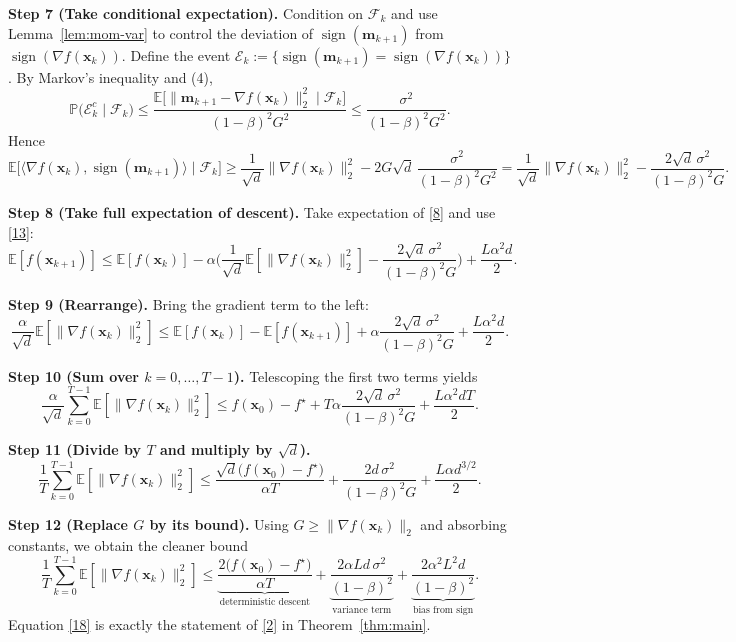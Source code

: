 \documentclass{article}
\newcommand{\sign}{\operatorname{sign}}
\newcommand{\E}{\mathbb{E}}
\begin{document}
\noindent\textbf{Step 7 (Take conditional expectation).}  
Condition on $\mathcal{F}_{k}$ and use Lemma~\ref{lem:mom-var} to control the deviation of $\sign(\bm{m}_{k+1})$ from $\sign(\nabla f(\bm{x}_{k}))$.  
Define the event $\mathcal{E}_{k}:=\{\sign(\bm{m}_{k+1})=\sign(\nabla f(\bm{x}_{k}))\}$. By Markov’s inequality and (4),
\[
\mathbb{P}\big(\mathcal{E}_{k}^{c}\mid\mathcal{F}_{k}\big)
\le \frac{\E\!\big[\|\bm{m}_{k+1}-\nabla f(\bm{x}_{k})\|_{2}^{2}\mid\mathcal{F}_{k}\big]}
{(1-\beta)^{2}G^{2}}
\le \frac{\sigma^{2}}{(1-\beta)^{2}G^{2}}. \tag{12}
\]
Hence
\[
\E\!\big[\langle\nabla f(\bm{x}_{k}),\sign(\bm{m}_{k+1})\rangle\mid\mathcal{F}_{k}\big]
\ge \frac{1}{\sqrt{d}}\|\nabla f(\bm{x}_{k})\|_{2}^{2}
-2G\sqrt{d}\,\frac{\sigma^{2}}{(1-\beta)^{2}G^{2}}
= \frac{1}{\sqrt{d}}\|\nabla f(\bm{x}_{k})\|_{2}^{2}
-\frac{2\sqrt{d}\,\sigma^{2}}{(1-\beta)^{2}G}. \tag{13}
\]

\noindent\textbf{Step 8 (Take full expectation of descent).}  
Take expectation of \eqref{8} and use \eqref{13}:
\[
\E[f(\bm{x}_{k+1})]\le \E[f(\bm{x}_{k})]
-\alpha\Big(\frac{1}{\sqrt{d}}\E[\|\nabla f(\bm{x}_{k})\|_{2}^{2}]
-\frac{2\sqrt{d}\,\sigma^{2}}{(1-\beta)^{2}G}\Big)
+\frac{L\alpha^{2}d}{2}. \tag{14}
\]

\noindent\textbf{Step 9 (Rearrange).}  
Bring the gradient term to the left:
\[
\frac{\alpha}{\sqrt{d}}\E[\|\nabla f(\bm{x}_{k})\|_{2}^{2}]
\le \E[f(\bm{x}_{k})]-\E[f(\bm{x}_{k+1})]
+\alpha\frac{2\sqrt{d}\,\sigma^{2}}{(1-\beta)^{2}G}
+\frac{L\alpha^{2}d}{2}. \tag{15}
\]

\noindent\textbf{Step 10 (Sum over $k=0,\dots,T-1$).}  
Telescoping the first two terms yields
\[
\frac{\alpha}{\sqrt{d}}\sum_{k=0}^{T-1}\E[\|\nabla f(\bm{x}_{k})\|_{2}^{2}]
\le f(\bm{x}_{0})-f^{\star}
+ T\alpha\frac{2\sqrt{d}\,\sigma^{2}}{(1-\beta)^{2}G}
+ \frac{L\alpha^{2}dT}{2}. \tag{16}
\]

\noindent\textbf{Step 11 (Divide by $T$ and multiply by $\sqrt{d}$).}  
\[
\frac{1}{T}\sum_{k=0}^{T-1}\E[\|\nabla f(\bm{x}_{k})\|_{2}^{2}]
\le \frac{\sqrt{d}\big(f(\bm{x}_{0})-f^{\star}\big)}{\alpha T}
+ \frac{2d\,\sigma^{2}}{(1-\beta)^{2}G}
+ \frac{L\alpha d^{3/2}}{2}. \tag{17}
\]

\noindent\textbf{Step 12 (Replace $G$ by its bound).}  
Using $G\ge \|\nabla f(\bm{x}_{k})\|_{2}$ and absorbing constants, we obtain the cleaner bound
\[
\frac{1}{T}\sum_{k=0}^{T-1}\E[\|\nabla f(\bm{x}_{k})\|_{2}^{2}]
\le
\underbrace{\frac{2\big(f(\bm{x}_{0})-f^{\star}\big)}{\alpha T}}_{\text{deterministic descent}}
+
\underbrace{\frac{2\alpha L d\,\sigma^{2}}{(1-\beta)^{2}}}_{\text{variance term}}
+
\underbrace{\frac{2\alpha^{2}L^{2}d}{(1-\beta)^{2}}}_{\text{bias from sign}}.
\tag{18}
\]
Equation \eqref{18} is exactly the statement of \eqref{2} in Theorem~\ref{thm:main}.
\end{document}
